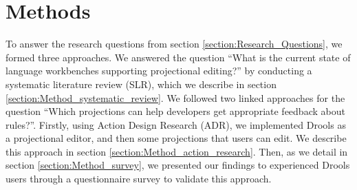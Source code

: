\chapter{Methods}
\label{chapter:Methods}

To answer the research questions from section \ref{section:Research_Questions}, we formed three approaches.
We answered the question ``What is the current state of language workbenches supporting projectional editing?'' by conducting a systematic literature review (SLR), which we describe in section \ref{section:Method_systematic_review}.
We followed two linked approaches for the question ``Which projections can help developers get appropriate feedback about rules?''.
Firstly, using Action Design Research (ADR), we implemented Drools as a projectional editor, and then some projections that users can edit.
We describe this approach in section \ref{section:Method_action_research}.
Then, as we detail in section \ref{section:Method_survey}, we presented our findings to experienced Drools users through a questionnaire survey to validate this approach.


\newpage

\newpage
